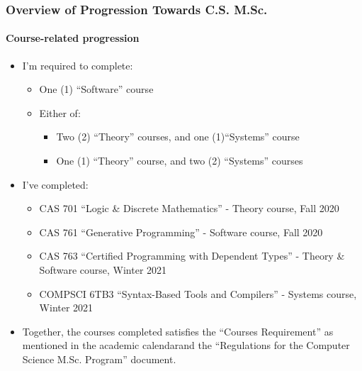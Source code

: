 \documentclass{beamer}
\begin{document}
\begin{frame}
    \frametitle{Overview of Progression Towards C.S. M.Sc.}
    \framesubtitle{Course-related progression}
    \begin{itemize}
        \item<1-> I'm required to complete\footnotemark[1]\footnotemark[2]:
            \begin{itemize}
                \item<2-> One (1) ``Software'' course
                \item<3-> Either of:
                    \begin{itemize}
                        \item<4-> Two (2) ``Theory'' courses, and one (1)``Systems'' course
                        \item<4-> One (1) ``Theory'' course, and two (2) ``Systems'' courses
                    \end{itemize}
            \end{itemize}
        \item<5-> I've completed:
            \begin{itemize}
                \item<6-> CAS 701 ``Logic \& Discrete Mathematics'' - Theory course, Fall 2020
                \item<7-> CAS 761 ``Generative Programming'' - Software course, Fall 2020
                \item<8-> CAS 763 ``Certified Programming with Dependent Types'' - Theory \& Software course, Winter 2021
                \item<9-> COMPSCI 6TB3 ``Syntax-Based Tools and Compilers'' - Systems course, Winter 2021
            \end{itemize}
        \item<10-> Together, the courses completed satisfies the ``Courses Requirement'' as mentioned in the academic calendar\footnotemark[1] and the ``Regulations for the Computer Science M.Sc. Program'' document\footnotemark[2].
    \end{itemize}

\end{frame}
\end{document}

